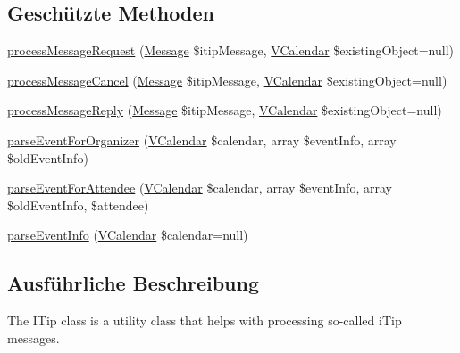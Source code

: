 \subsection*{Geschützte Methoden}
\begin{DoxyCompactItemize}
\item 
\mbox{\hyperlink{class_sabre_1_1_v_object_1_1_i_tip_1_1_broker_ae84bd0183c55a78d8b02da336d23245f}{process\+Message\+Request}} (\mbox{\hyperlink{class_sabre_1_1_v_object_1_1_i_tip_1_1_message}{Message}} \$itip\+Message, \mbox{\hyperlink{class_sabre_1_1_v_object_1_1_component_1_1_v_calendar}{V\+Calendar}} \$existing\+Object=null)
\item 
\mbox{\hyperlink{class_sabre_1_1_v_object_1_1_i_tip_1_1_broker_a7531e6ef22578de6d2155651f70870d1}{process\+Message\+Cancel}} (\mbox{\hyperlink{class_sabre_1_1_v_object_1_1_i_tip_1_1_message}{Message}} \$itip\+Message, \mbox{\hyperlink{class_sabre_1_1_v_object_1_1_component_1_1_v_calendar}{V\+Calendar}} \$existing\+Object=null)
\item 
\mbox{\hyperlink{class_sabre_1_1_v_object_1_1_i_tip_1_1_broker_a34e234968e4ec3f80414aebcb4d59b91}{process\+Message\+Reply}} (\mbox{\hyperlink{class_sabre_1_1_v_object_1_1_i_tip_1_1_message}{Message}} \$itip\+Message, \mbox{\hyperlink{class_sabre_1_1_v_object_1_1_component_1_1_v_calendar}{V\+Calendar}} \$existing\+Object=null)
\item 
\mbox{\hyperlink{class_sabre_1_1_v_object_1_1_i_tip_1_1_broker_af1fbc1b20cb3e90f182d5f5c27821ed0}{parse\+Event\+For\+Organizer}} (\mbox{\hyperlink{class_sabre_1_1_v_object_1_1_component_1_1_v_calendar}{V\+Calendar}} \$calendar, array \$event\+Info, array \$old\+Event\+Info)
\item 
\mbox{\hyperlink{class_sabre_1_1_v_object_1_1_i_tip_1_1_broker_a7ccb74b74b3ad5cde0c12013c17fea70}{parse\+Event\+For\+Attendee}} (\mbox{\hyperlink{class_sabre_1_1_v_object_1_1_component_1_1_v_calendar}{V\+Calendar}} \$calendar, array \$event\+Info, array \$old\+Event\+Info, \$attendee)
\item 
\mbox{\hyperlink{class_sabre_1_1_v_object_1_1_i_tip_1_1_broker_a09651ce5e508b8fc60528f77039c07de}{parse\+Event\+Info}} (\mbox{\hyperlink{class_sabre_1_1_v_object_1_1_component_1_1_v_calendar}{V\+Calendar}} \$calendar=null)
\end{DoxyCompactItemize}


\subsection{Ausführliche Beschreibung}
The I\+Tip class is a utility class that helps with processing so-\/called i\+Tip messages.

